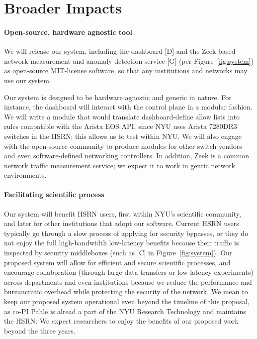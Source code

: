 \section{Broader Impacts}\label{sec:impacts}

\paragraph{Open-source, hardware agnostic tool}
We will release our system, including the dashboard [D] and the Zeek-based network measurement and anomaly detection service [G] (per Figure~\ref{fig:system}) as open-source MIT-license software, so that any institutions and networks may use our system.

Our system is designed to be hardware agnostic and generic in nature. For instance, the dashboard will interact with the control plane in a modular fashion. We will write a module that would translate dashboard-define allow lists into rules compatible with the Arista EOS API, since NYU uses Arista 7280DR3 switches in the HSRN; this allows us to test within NYU. We will also engage with the open-source community to produce modules for other switch vendors and even software-defined networking controllers. In addition, Zeek is a common network traffic measurement service; we expect it to work in genric network environments.

\paragraph{Facilitating scientific process}
Our system will benefit HSRN users, first within NYU's scientific community, and later for other institutions that adopt our software. Current HSRN users typically go through a slow process of applying for security bypasses, or they do not enjoy the full high-bandwidth low-latency benefits because their traffic is inspected by security middleboxes (such as [C] in Figure~\ref{fig:system}). Our proposed system will allow for efficient and secure scientific processes, and encourage collaboration (through large data transfers or low-latency experiments) across departments and even institutions because we reduce the performance and bureaucratic overhead while protecting the security of the network. We mean to keep our proposed system operational even beyond the timeline of this proposal, as co-PI Pahle is alread a part of the NYU Research Technology and maintains the HSRN. We expect researchers to enjoy the benefits of our proposed work beyond the three years.

